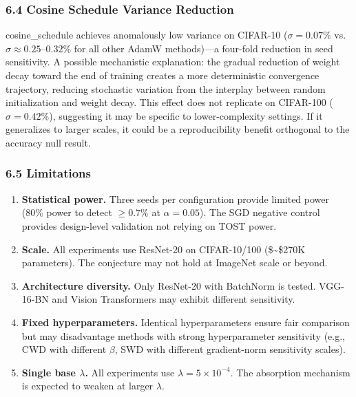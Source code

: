 \documentclass[
]{article}
\begin{document}
\hypertarget{cosine-schedule-variance-reduction}{%
\subsubsection{6.4 Cosine Schedule Variance
Reduction}\label{cosine-schedule-variance-reduction}}

cosine\_schedule achieves anomalously low variance on CIFAR-10
(\(\sigma = 0.07\%\) vs.~\(\sigma \approx 0.25\)--\(0.32\%\) for all
other AdamW methods)---a four-fold reduction in seed sensitivity. A
possible mechanistic explanation: the gradual reduction of weight decay
toward the end of training creates a more deterministic convergence
trajectory, reducing stochastic variation from the interplay between
random initialization and weight decay. This effect does not replicate
on CIFAR-100 (\(\sigma = 0.42\%\)), suggesting it may be specific to
lower-complexity settings. If it generalizes to larger scales, it could
be a reproducibility benefit orthogonal to the accuracy null result.

\hypertarget{limitations}{%
\subsubsection{6.5 Limitations}\label{limitations}}

\begin{enumerate}
\def\labelenumi{\arabic{enumi}.}
\item
  \textbf{Statistical power.} Three seeds per configuration provide
  limited power (80\% power to detect \(\geq 0.7\%\) at
  \(\alpha = 0.05\)). The SGD negative control provides design-level
  validation not relying on TOST power.
\item
  \textbf{Scale.} All experiments use ResNet-20 on CIFAR-10/100
  (\$\sim\$270K parameters). The conjecture may not hold at ImageNet
  scale or beyond.
\item
  \textbf{Architecture diversity.} Only ResNet-20 with BatchNorm is
  tested. VGG-16-BN and Vision Transformers may exhibit different
  sensitivity.
\item
  \textbf{Fixed hyperparameters.} Identical hyperparameters ensure fair
  comparison but may disadvantage methods with strong hyperparameter
  sensitivity (e.g., CWD with different \(\beta\), SWD with different
  gradient-norm sensitivity scales).
\item
  \textbf{Single base \(\lambda\).} All experiments use
  \(\lambda = 5 \times 10^{-4}\). The absorption mechanism is expected
  to weaken at larger \(\lambda\).
\end{enumerate}
\end{document}
